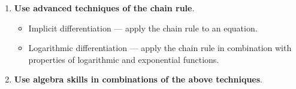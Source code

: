\documentclass[../main.tex]{subfiles}
\begin{document}
\begin{enumerate}
\begin{itemize}
        The derivative of any algebraic functions can be evaluated using these two formulas and differentiation rules.

      \item \(\frac{d}{dx} e^{x} = e^{x}\) and \(\frac{d}{dx} \ln(x) = \frac{1}{x}\).

      \item \(\frac{d}{dx} \sin(x) = \cos(x)\) and \(\frac{d}{dx} \cos(x) = - \sin(x)\).
    \end{itemize}

  \item \textbf{Use advanced techniques of the chain rule}.
    \begin{itemize}
      \item Implicit differentiation --- apply the chain rule to an equation.
      \item Logarithmic differentiation --- apply the chain rule in combination with properties of logarithmic and exponential functions.
    \end{itemize}

  \item \textbf{Use algebra skills in combinations of the above techniques}.
\end{enumerate}
\end{document}
